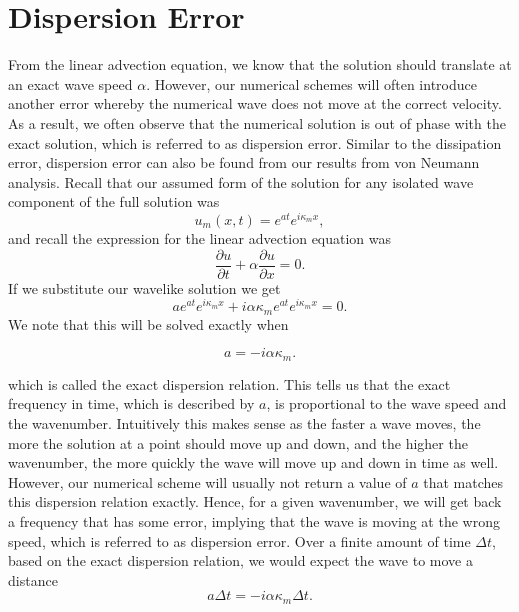 \section{Dispersion Error}
From the linear advection equation, we know that the solution should translate at an exact wave speed $\alpha$. However, our numerical schemes will often introduce another error whereby the numerical wave does not move at the correct velocity. As a result, we often observe that the numerical solution is out of phase with the exact solution, which is referred to as dispersion error. Similar to the dissipation error, dispersion error can also be found from our results from von Neumann analysis. Recall that our assumed form of the solution for any isolated wave component of the full solution was
\begin{equation}
	u_m(x,t) = e^{at} e^{i \kappa_m x},
\end{equation}
and recall the expression for the linear advection equation was
\begin{equation}
	\frac{\partial u}{\partial t} +  \alpha \frac{\partial u}{\partial x} = 0.
\end{equation}
If we substitute our wavelike solution we get
\begin{equation}
	ae^{at} e^{i \kappa_m x} + i \alpha \kappa_m e^{at} e^{i \kappa_m x} = 0.
\end{equation}
We note that this will be solved exactly when
\begin{eqBox}
\begin{equation}
	a = -i \alpha \kappa_m.
\end{equation}
\end{eqBox}
which is called the exact dispersion relation. This tells us that the exact frequency in time, which is described by $a$, is proportional to the wave speed and the wavenumber. Intuitively this makes sense as the faster a wave moves, the more the solution at a point should move up and down, and the higher the wavenumber, the more quickly the wave will move up and down in time as well. However, our numerical scheme will usually not return a value of $a$ that matches this dispersion relation exactly. Hence, for a given wavenumber, we will get back a frequency that has some error, implying that the wave is moving at the wrong speed, which is referred to as dispersion error. Over a finite amount of time $\Delta t$, based on the exact dispersion relation, we would expect the wave to move a distance
\begin{equation}
	a \Delta t = -i \alpha \kappa_m \Delta t.
\end{equation}

